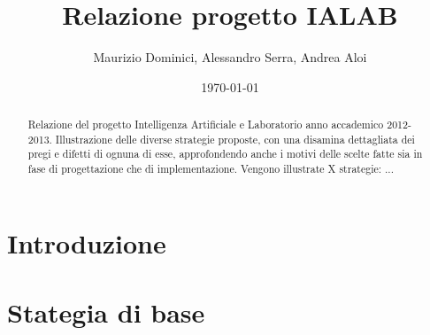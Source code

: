 \documentclass[a4paper,12pt]{report}
\title{Relazione progetto IALAB}
\author{Maurizio Dominici, Alessandro Serra, Andrea Aloi}
\date{\today}
\begin{document}
\maketitle
 
\begin{abstract}
Relazione del progetto Intelligenza Artificiale e Laboratorio anno accademico 2012-2013.
Illustrazione delle diverse strategie proposte, con una disamina dettagliata dei pregi e difetti di ognuna di esse, approfondendo anche i motivi delle scelte fatte sia in fase di progettazione che di implementazione. Vengono illustrate X strategie: ...
\end{abstract}

\newpage
 
\tableofcontents
\clearpage{\pagestyle{empty}\cleardoublepage}

\chapter{Introduzione} \label{cap:intro}


\chapter{Stategia di base} \label{cap:base}

\end{document}
